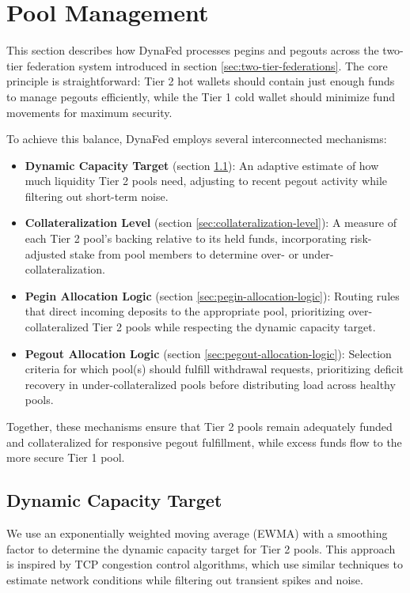 \section{Pool Management}
\label{sec:pool-management}

This section describes how DynaFed processes pegins and pegouts across the two-tier federation system introduced in section \ref{sec:two-tier-federations}. The core principle is straightforward: Tier 2 hot wallets should contain just enough funds to manage pegouts efficiently, while the Tier 1 cold wallet should minimize fund movements for maximum security.

To achieve this balance, DynaFed employs several interconnected mechanisms:

\begin{itemize}
    \item \textbf{Dynamic Capacity Target} (section \ref{sec:dynamic-capacity-target}): An adaptive estimate of how much liquidity Tier 2 pools need, adjusting to recent pegout activity while filtering out short-term noise.
    \item \textbf{Collateralization Level} (section \ref{sec:collateralization-level}): A measure of each Tier 2 pool's backing relative to its held funds, incorporating risk-adjusted stake from pool members to determine over- or under-collateralization.
    \item \textbf{Pegin Allocation Logic} (section \ref{sec:pegin-allocation-logic}): Routing rules that direct incoming deposits to the appropriate pool, prioritizing over-collateralized Tier 2 pools while respecting the dynamic capacity target.
    \item \textbf{Pegout Allocation Logic} (section \ref{sec:pegout-allocation-logic}): Selection criteria for which pool(s) should fulfill withdrawal requests, prioritizing deficit recovery in under-collateralized pools before distributing load across healthy pools.
\end{itemize}

Together, these mechanisms ensure that Tier 2 pools remain adequately funded and collateralized for responsive pegout fulfillment, while excess funds flow to the more secure Tier 1 pool.

\subsection{Dynamic Capacity Target}
\label{sec:dynamic-capacity-target}

We use an exponentially weighted moving average (EWMA) with a smoothing factor to determine the dynamic capacity target for Tier 2 pools. This approach is inspired by TCP congestion control algorithms, which use similar techniques to estimate network conditions while filtering out transient spikes and noise.

